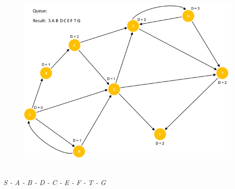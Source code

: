 \documentclass{article}
\begin{document}
\begin{figure}[H]
\centering
\includegraphics[scale=0.6]{images/Q4/18.png}
\end{figure}

\begin{center}
\textit{\\S - A - B - D - C - E - F - T - G\\}
\end{center}
\newpage
\end{document}
